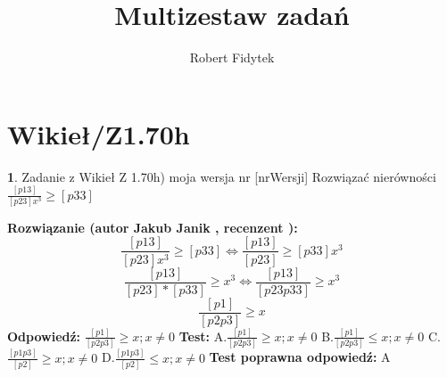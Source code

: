 \documentclass[12pt, a4paper]{article}
\title{Multizestaw zadań}
\author{Robert Fidytek}
\date{}
\theoremstyle{definition} %
\newtheorem{zad}{}
\newcommand{\kategoria}[1]{\section{#1}} %
\newcommand{\zadStart}[1]{\begin{zad}#1\newline} %
\newcommand{\zadStop}{\end{zad}}   %
\newcommand{\rozwStart}[2]{\noindent \textbf{Rozwiązanie (autor #1 , recenzent #2): }\newline} %
\newcommand{\rozwStop}{\newline}                                            %
\newcommand{\odpStart}{\noindent \textbf{Odpowiedź:}\newline}    %
\newcommand{\odpStop}{\newline}                                             %
\newcommand{\testStart}{\noindent \textbf{Test:}\newline} %
\newcommand{\testStop}{\newline} %
\newcommand{\kluczStart}{\noindent \textbf{Test poprawna odpowiedź:}\newline} %
\newcommand{\kluczStop}{\newline} %
\begin{document}
\maketitle


\kategoria{Wikieł/Z1.70h}
\zadStart{Zadanie z Wikieł Z 1.70h) moja wersja nr [nrWersji]}
Rozwiązać nierówności $\frac{[p13]}{[p23]x^3} \geq [p33]$
\zadStop
\rozwStart{Jakub Janik}{}
$$\frac{[p13]}{[p23]x^3} \geq [p33] \Leftrightarrow \frac{[p13]}{[p23]} \geq [p33]x^3$$
$$\frac{[p13]}{[p23]*[p33]} \geq x^3 \Leftrightarrow \frac{[p13]}{[p23p33]} \geq x^3$$
$$\frac{[p1]}{[p2p3]} \geq x$$
\rozwStop
\odpStart
$\frac{[p1]}{[p2p3]} \geq x; x \neq 0$
\odpStop
\testStart
A.$\frac{[p1]}{[p2p3]} \geq x; x \neq 0$
B.$\frac{[p1]}{[p2p3]} \leq x; x \neq 0$
C.$\frac{[p1p3]}{[p2]} \geq x; x \neq 0$
D.$\frac{[p1p3]}{[p2]} \leq x; x \neq 0$
\testStop
\kluczStart
A
\kluczStop
\end{document}
